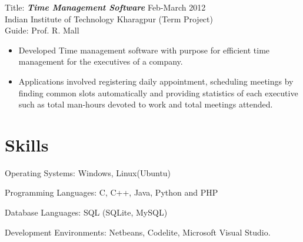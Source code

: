 \documentclass[hidelinks,margin,line,10pt,a4paper]{resume}
\begin{document}
\begin{resume}
Title: \textbf{\emph{Time Management Software }} \hfill Feb-March 2012 \\
Indian Institute of Technology Kharagpur \hfill (Term Project)  \\
Guide: Prof. R. Mall
\vspace{2mm}%
\begin{itemize}
\item Developed Time management software with purpose for efficient time management for the executives of a company.
\item Applications involved registering daily appointment, scheduling meetings by finding common slots automatically and providing statistics of each executive such as total man-hours devoted to work and total meetings attended.
\end{itemize}




    \section{\mysidestyle Skills} 

\begin{list2}
\item Operating Systems: Windows, Linux(Ubuntu)\vspace{1mm}%
\item Programming Languages: C, C++, Java, Python and PHP \vspace{1mm}%
\item Database Languages: SQL (SQLite, MySQL)\vspace{1mm}%
\item Development Environments: Netbeans, Codelite, Microsoft Visual Studio.\vspace{1mm}%
\end{list2}


    

\end{resume}
\end{document}
